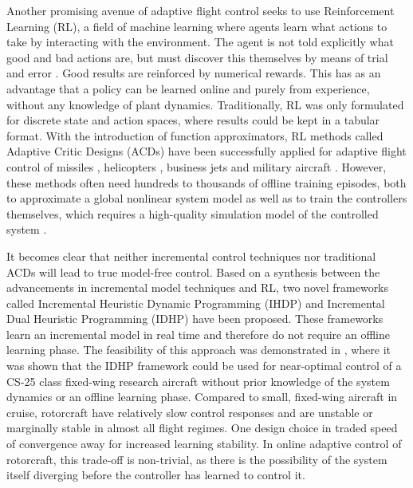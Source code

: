 Another promising avenue of adaptive flight control seeks to use Reinforcement Learning (RL), a field of machine learning where agents learn what actions to take by interacting with the environment. The agent is not told explicitly what good and bad actions are, but must discover this themselves by means of trial and error \cite{book:suttonbarto}. Good results are reinforced by numerical rewards. This has as an advantage that a policy can be learned online and purely from experience, without any knowledge of plant dynamics. Traditionally, RL was only formulated for discrete state and action spaces, where results could be kept in a tabular format. With the introduction of function approximators, RL methods called Adaptive Critic Designs (ACDs) have been successfully applied for adaptive flight control of missiles \cite{Bertsekas2000}, helicopters \cite{Enns2002, Enns2003a, Enns2003b}, business jets \cite{Ferrari2004} and military aircraft \cite{VanKampen2006}. However, these methods often need hundreds to thousands of offline training episodes, both to approximate a global nonlinear system model as well as to train the controllers themselves, which requires a high-quality simulation model of the controlled system \cite{Prokhorov1995, Balakrishnan1996, Prokhorov1997}. 

It becomes clear that neither incremental control techniques nor traditional ACDs will lead to true model-free control. Based on a synthesis between the advancements in incremental model techniques and RL, two novel frameworks called Incremental Heuristic Dynamic Programming (IHDP) \cite{Zhou2016HDP} and Incremental Dual Heuristic Programming (IDHP) \cite{Zhou2018DHP} have been proposed. These frameworks learn an incremental model in real time and therefore do not require an offline learning phase. The feasibility of this approach was demonstrated in \cite{Heyer2020}, where it was shown that the IDHP framework could be used for near-optimal control of a CS-25 class fixed-wing research aircraft without prior knowledge of the system dynamics or an offline learning phase. Compared to small, fixed-wing aircraft in cruise, rotorcraft have relatively slow control responses and are unstable or marginally stable in almost all flight regimes. One design choice in \cite{Heyer2020} traded speed of convergence away for increased learning stability. In online adaptive control of rotorcraft, this trade-off is non-trivial, as there is the possibility of the system itself diverging before the controller has learned to control it. 

